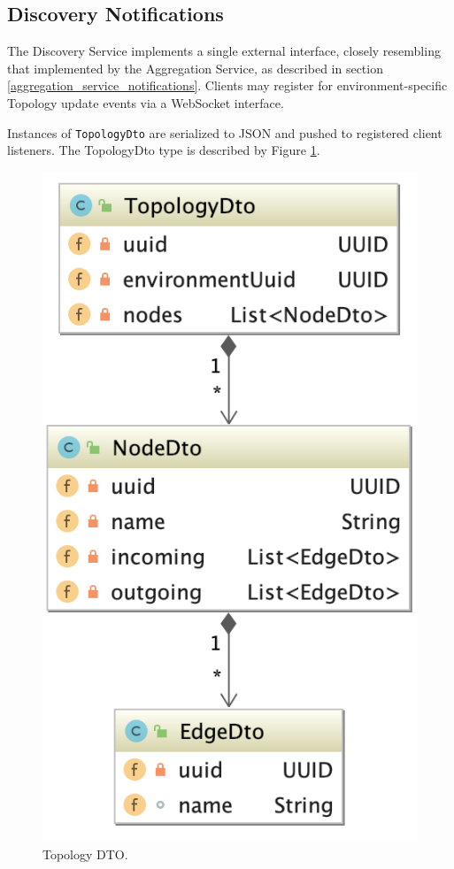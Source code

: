 \subsection{Discovery Notifications} \label{discovery_service_notifications}
The Discovery Service implements a single external interface, closely resembling that implemented by the Aggregation Service, as described in section \ref{aggregation_service_notifications}. Clients may register for environment-specific Topology update events via a WebSocket interface.

Instances of \texttt{TopologyDto} are serialized to JSON and pushed to registered client listeners. The TopologyDto type is described by Figure \ref{topology_dto}.

\begin{figure}[H]
	\centering  
	\includegraphics[scale=1.5]{figures/impl/discovery/topology_dto.png}
	\caption{Topology DTO.}
	\label{topology_dto}
\end{figure}

